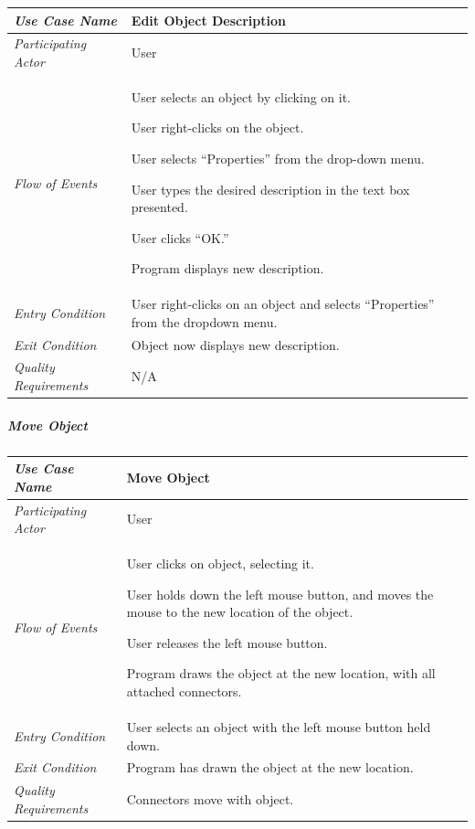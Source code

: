 \documentclass[twoside,letterpaper]{article}
\newenvironment{my_enumerate}{
\begin{enumerate}
  \setlength{\itemsep}{1pt}
  \setlength{\parskip}{0pt}
  \setlength{\parsep}{0pt}}{\end{enumerate}
}
\begin{document}
\begin{flushleft}
\tablehead{}
\begin{tabular}{|m{2.0in} m{5.0in}|}
\hline
{\bfseries\emph{Use Case Name}}
& {\bfseries Edit Object Description}
\\\hline
\emph{Participating Actor}
& User
\\\hline
\emph{Flow of Events}
& \begin{my_enumerate}
\item User selects an object by clicking on it.
\item User right-clicks on the object.
\item User selects ``Properties'' from the drop-down menu.
\item User types the desired description in the text box presented.
\item User clicks ``OK.''
\item Program displays new description.
\end{my_enumerate}
\\\hline
\emph{Entry Condition}
& User right-clicks on an object and selects ``Properties'' from the dropdown menu.
\\\hline
\emph{Exit Condition}
& Object now displays new description.
\\\hline
\emph{Quality Requirements}
& N/A
\\\hline
\end{tabular}
\end{flushleft}
\bigskip



\subparagraph[\ Move Object ] 
{\bfseries Move Object }

\begin{flushleft}
\tablehead{}
\begin{tabular}{|m{2.0in} m{5.0in}|}
\hline
{\bfseries\emph{Use Case Name}}
& {\bfseries Move Object}
\\\hline
\emph{Participating Actor}
& User
\\\hline
\emph{Flow of Events}
& \begin{my_enumerate}
\item User clicks on object, selecting it.
\item User holds down the left mouse button, and moves the mouse to the new location of the object.
\item User releases the left mouse button.
\item Program draws the object at the new location, with all attached connectors. 
\end{my_enumerate}
\\\hline
\emph{Entry Condition}
& User selects an object with the left mouse button held down.
\\\hline
\emph{Exit Condition}
& Program has drawn the object at the new location.
\\\hline
\emph{Quality Requirements}
& Connectors move with object. 
\\\hline
\end{tabular}
\end{flushleft}
\bigskip
\end{document}

